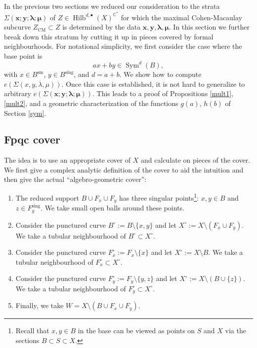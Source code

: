 \documentclass{amsart}
\theoremstyle{definition}
\newcommand{\CC} {\mathbb{C}}          %
\newcommand{\Sym}{\operatorname{Sym}}
\newcommand{\Hilb}{\operatorname{Hilb}}
\newcommand{\CM}{\operatorname{CM}}
\newcommand{\sm}{\operatorname{sm}}
\newcommand{\sing}{\operatorname{sing}}
\begin{document}
In the previous two sections we reduced our consideration to the strata $\Sigma(\boldsymbol{x};\boldsymbol{y};\boldsymbol{\lambda};\boldsymbol{\mu})$ of $Z \in \Hilb^{d,\bullet}(X)^{\CC^*}$ for which the maximal Cohen-Macaulay subcurve $Z_{\CM} \subset Z$ is determined by the data $\boldsymbol{x}, \boldsymbol{y}, \boldsymbol{\lambda}, \boldsymbol{\mu}$. In this section we further break down this stratum by cutting it up in pieces covered by formal neighbourhoods. For notational simplicity, we first consider the case where the base point is 
$$
a x + b y \in \Sym^d(B),
$$
with $x \in B^{\sm}$, $y \in B^{\sing}$, and $d=a+b$. We show how to compute $e(\Sigma(x,y,\lambda,\mu))$. Once this case is established, it is not hard to generalize to arbitrary $e(\Sigma(\boldsymbol{x};\boldsymbol{y};\boldsymbol{\lambda};\boldsymbol{\mu}))$. This leads to a proof of Propositions \ref{mult1}, \ref{mult2}, and a geometric characterization of the functions $g(a)$, $h(b)$ of Section \ref{sym}.


\subsection{Fpqc cover}

The idea is to use an appropriate cover of $X$ and calculate on pieces of the cover. We first give a complex analytic definition of the cover to aid the intuition and then give the actual ``algebro-geometric cover'': 
\begin{enumerate}
\item The reduced support $B \cup F_x \cup F_y$ has three singular points\footnote{Recall that $x,y \in B$ in the base can be viewed as points on $S$ and $X$ via the sections $B \subset S \subset X$.}: $x,y \in B$ and $z \in F^{\sing}_{y}$. We take small open balls around these points.
\item Consider the punctured curve $B^\circ := B \setminus \{x,y\}$ and let $X^\circ := X \setminus (F_x  \cup F_y)$. We take a tubular neighbourhood of $B^\circ \subset X^\circ$.
\item Consider the punctured curve $F_{x}^{\circ} := F_x \setminus \{x\}$ and let $X^\circ := X \setminus B$. We take a tubular neighbourhood of $F_{x}^\circ \subset X^\circ$.
\item Consider the punctured curve $F_{y}^{\circ} := F_y \setminus \{y,z\}$ and let $X^\circ := X \setminus (B \cup \{z\})$. We take a tubular neighbourhood of $F_{y}^{\circ} \subset X^\circ$.
\item Finally, we take $W = X \setminus (B \cup F_x \cup F_y)$. 
\end{enumerate}
\end{document}
